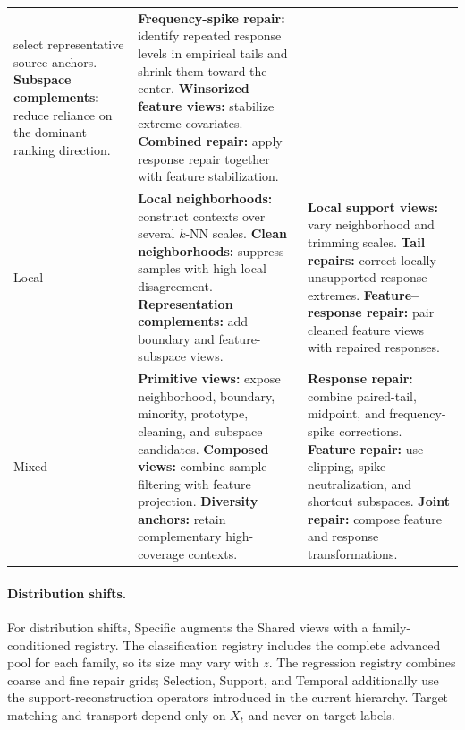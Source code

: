 \begin{longtable}{@{}>{\raggedright\arraybackslash}p{} >{\raggedright\arraybackslash}p{} >{\raggedright\arraybackslash}p{}@{}}
{        views:} select representative source anchors. \textbf{Subspace
        complements:} reduce reliance on the dominant ranking direction.
      & \textbf{Frequency-spike repair:} identify repeated response levels in
        empirical tails and shrink them toward the center. \textbf{Winsorized
        feature views:} stabilize extreme covariates. \textbf{Combined repair:}
        apply response repair together with feature stabilization. \\
    Local
      & \textbf{Local neighborhoods:} construct contexts over several $k$-NN
        scales. \textbf{Clean neighborhoods:} suppress samples with high local
        disagreement. \textbf{Representation complements:} add boundary and
        feature-subspace views.
      & \textbf{Local support views:} vary neighborhood and trimming scales.
        \textbf{Tail repairs:} correct locally unsupported response extremes.
        \textbf{Feature--response repair:} pair cleaned feature views with
        repaired responses. \\
    Mixed
      & \textbf{Primitive views:} expose neighborhood, boundary, minority,
        prototype, cleaning, and subspace candidates. \textbf{Composed views:}
        combine sample filtering with feature projection. \textbf{Diversity
        anchors:} retain complementary high-coverage contexts.
      & \textbf{Response repair:} combine paired-tail, midpoint, and
        frequency-spike corrections. \textbf{Feature repair:} use clipping,
        spike neutralization, and shortcut subspaces. \textbf{Joint repair:}
        compose feature and response transformations. \\
  \end{longtable}
\endgroup

\paragraph{Distribution shifts.}
For distribution shifts, Specific augments the Shared views with a
family-conditioned registry. The classification registry includes the complete
advanced pool for each family, so its size may vary with $z$. The regression
registry combines coarse and fine repair grids; Selection, Support, and
Temporal additionally use the support-reconstruction operators introduced in
the current hierarchy. Target matching and transport depend only on $X_t$ and
never on target labels.

